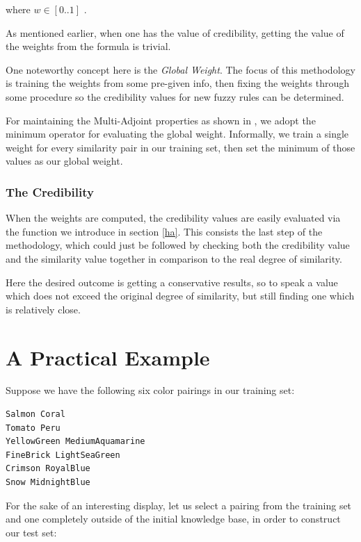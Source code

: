 \documentclass[egilmezThesis.tex]{subfiles}
\begin{document}
where $w \in [0..1]$ .

As mentioned earlier, when one has the value of credibility, getting the value of the weights from the formula is trivial. 

One noteworthy concept here is the \textit{Global Weight}. The focus of this methodology is training the weights from some pre-given info, then fixing the weights through some procedure so the credibility values for new fuzzy rules can be determined. 

For maintaining the Multi-Adjoint properties as shown in \cite{MPS10}, we adopt the minimum operator for evaluating the global weight. Informally, we train a single weight for every similarity pair in our training set, then set the minimum of those values as our global weight.


\subsubsection{The Credibility}
\label{credPE}

When the weights are computed, the credibility values are easily evaluated via the function we introduce in section \ref{ha}. This consists the last step of the methodology, which could just be followed by checking both the credibility value and the similarity value together in comparison to the real degree of similarity.

Here the desired outcome is getting a conservative results, so to speak a value which does not exceed the original degree of similarity, but still finding one which is relatively close.

\section{A Practical Example}
\label{ape}

Suppose we have the following six color pairings in our training set:
\newline

\lstset{language=C++,basicstyle=\footnotesize}
\begin{lstlisting}[caption=The training set, breaklines=true]
Salmon Coral
Tomato Peru
YellowGreen MediumAquamarine	
FineBrick LightSeaGreen
Crimson RoyalBlue
Snow MidnightBlue
\end{lstlisting}

For the sake of an interesting display, let us select a pairing from the training set and one completely outside of the initial knowledge base, in order to construct our test set:
\newline
\end{document}
